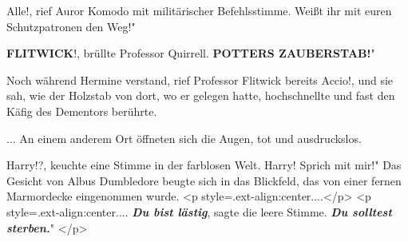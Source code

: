 \glqq Alle!\grqq{}, rief Auror Komodo mit militärischer Befehlsstimme. \glqq
Weißt ihr mit euren Schutzpatronen den Weg!"

\glqq \textbf{FLITWICK}!\grqq{}, brüllte Professor Quirrell. \glqq
\textbf{POTTERS ZAUBERSTAB!}"

Noch während Hermine verstand, rief Professor Flitwick bereits \glqq
Accio!\grqq{}, und sie sah, wie der Holzstab von dort, wo er gelegen hatte,
hochschnellte und fast den Käfig des Dementors berührte.

... An einem anderem Ort öffneten sich die Augen, tot und ausdruckslos.

\glqq Harry!?\grqq{}, keuchte eine Stimme in der farblosen Welt. \glqq Harry!
Sprich mit mir!" Das Gesicht von Albus Dumbledore beugte sich in das Blickfeld,
das von einer fernen Marmordecke eingenommen wurde. <p
style=\grqq{}.ext-align:center\grqq{}....</p> <p
style=\grqq{}.ext-align:center\grqq{}.... \glqq \textbf{\emph{Du bist
lästig}}\grqq{}, sagte die leere Stimme. \glqq \textbf{\emph{Du solltest
sterben.}}" </p>

